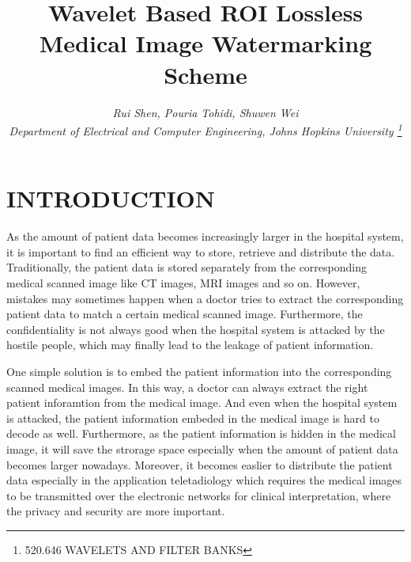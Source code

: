 \documentclass[letterpaper, 10 pt, conference]{ieeeconf}  %
\title{\LARGE \bf {Wavelet Based ROI Lossless Medical Image Watermarking Scheme}}
\author{\it Rui Shen, Pouria Tohidi, Shuwen Wei  \\ %
\normalsize {Department of Electrical and Computer Engineering, Johns Hopkins University}
\thanks{520.646 WAVELETS AND FILTER BANKS}}
\begin{document}
\maketitle
\thispagestyle{empty}
\pagestyle{empty}


\begin{abstract}


\end{abstract}


\section{INTRODUCTION}
As the amount of patient data becomes increasingly larger in the hospital system, it is important to find an efficient way to store, retrieve and distribute the data. Traditionally, the patient data is stored separately from the corresponding medical scanned image like CT images, MRI images and so on. However, mistakes may sometimes happen when a doctor tries to extract the corresponding patient data to match a certain medical scanned image. Furthermore, the confidentiality is not always good when the hospital system is attacked by the hostile people, which may finally lead to the leakage of patient information.

One simple solution is to embed the patient information into the corresponding scanned medical images. In this way, a doctor can always extract the right patient inforamtion from the medical image. And even when the hospital system is attacked, the patient information embeded in the medical image is hard to decode as well. Furthermore, as the patient information is hidden in the medical image, it will save the strorage space especially when the amount of patient data becomes larger nowadays. Moreover, it becomes easlier to distribute the patient data especially in the application teletadiology which requires the medical images to be transmitted over the electronic networks for clinical interpretation, where the privacy and security are more important.
\end{document}
